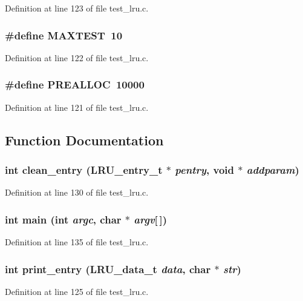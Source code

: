 Definition at line 123 of file test\_\-lru.c.
\subsubsection[{MAXTEST}]{\setlength{\rightskip}{0pt plus 5cm}\#define MAXTEST~10}\label{test__lru_8c_03d9dd35a7b43ebc597de16d46a0e845}




Definition at line 122 of file test\_\-lru.c.
\subsubsection[{PREALLOC}]{\setlength{\rightskip}{0pt plus 5cm}\#define PREALLOC~10000}\label{test__lru_8c_9dadacd5ee41d21ea8974d66757983dd}




Definition at line 121 of file test\_\-lru.c.

\subsection{Function Documentation}
\subsubsection[{clean\_\-entry}]{\setlength{\rightskip}{0pt plus 5cm}int clean\_\-entry (LRU\_\-entry\_\-t $\ast$ {\em pentry}, \/  void $\ast$ {\em addparam})}\label{test__lru_8c_ed3b7c3b1bdb635f3c7d88e630279b79}




Definition at line 130 of file test\_\-lru.c.
\subsubsection[{main}]{\setlength{\rightskip}{0pt plus 5cm}int main (int {\em argc}, \/  char $\ast$ {\em argv}[$\,$])}\label{test__lru_8c_0ddf1224851353fc92bfbff6f499fa97}




Definition at line 135 of file test\_\-lru.c.
\subsubsection[{print\_\-entry}]{\setlength{\rightskip}{0pt plus 5cm}int print\_\-entry (LRU\_\-data\_\-t {\em data}, \/  char $\ast$ {\em str})}\label{test__lru_8c_ea38d63e4172f007b92d4bfeebb6b6d2}




Definition at line 125 of file test\_\-lru.c.